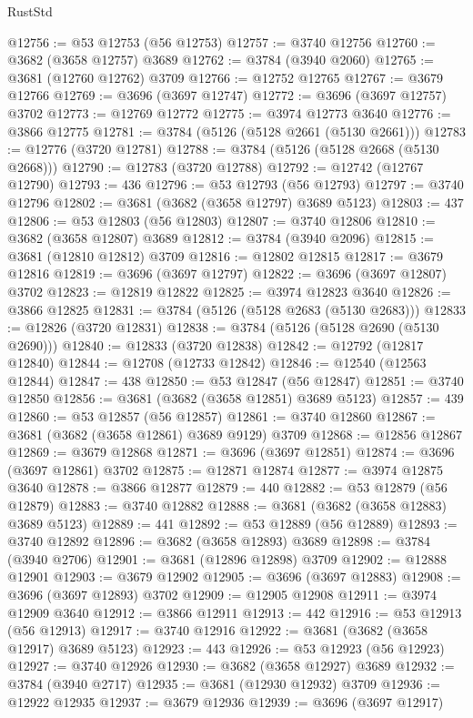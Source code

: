 \begin{lexlean}{RustStd}
\begin{coremodule}
@12756 := @53 @12753 (@56 @12753)
@12757 := @3740 @12756
@12760 := @3682 (@3658 @12757) @3689
@12762 := @3784 (@3940 @2060)
@12765 := @3681 (@12760 @12762) @3709
@12766 := @12752 @12765
@12767 := @3679 @12766
@12769 := @3696 (@3697 @12747)
@12772 := @3696 (@3697 @12757) @3702
@12773 := @12769 @12772
@12775 := @3974 @12773 @3640
@12776 := @3866 @12775
@12781 := @3784 (@5126 (@5128 @2661 (@5130 @2661)))
@12783 := @12776 (@3720 @12781)
@12788 := @3784 (@5126 (@5128 @2668 (@5130 @2668)))
@12790 := @12783 (@3720 @12788)
@12792 := @12742 (@12767 @12790)
@12793 := 436
@12796 := @53 @12793 (@56 @12793)
@12797 := @3740 @12796
@12802 := @3681 (@3682 (@3658 @12797) @3689 @5123)
@12803 := 437
@12806 := @53 @12803 (@56 @12803)
@12807 := @3740 @12806
@12810 := @3682 (@3658 @12807) @3689
@12812 := @3784 (@3940 @2096)
@12815 := @3681 (@12810 @12812) @3709
@12816 := @12802 @12815
@12817 := @3679 @12816
@12819 := @3696 (@3697 @12797)
@12822 := @3696 (@3697 @12807) @3702
@12823 := @12819 @12822
@12825 := @3974 @12823 @3640
@12826 := @3866 @12825
@12831 := @3784 (@5126 (@5128 @2683 (@5130 @2683)))
@12833 := @12826 (@3720 @12831)
@12838 := @3784 (@5126 (@5128 @2690 (@5130 @2690)))
@12840 := @12833 (@3720 @12838)
@12842 := @12792 (@12817 @12840)
@12844 := @12708 (@12733 @12842)
@12846 := @12540 (@12563 @12844)
@12847 := 438
@12850 := @53 @12847 (@56 @12847)
@12851 := @3740 @12850
@12856 := @3681 (@3682 (@3658 @12851) @3689 @5123)
@12857 := 439
@12860 := @53 @12857 (@56 @12857)
@12861 := @3740 @12860
@12867 := @3681 (@3682 (@3658 @12861) @3689 @9129) @3709
@12868 := @12856 @12867
@12869 := @3679 @12868
@12871 := @3696 (@3697 @12851)
@12874 := @3696 (@3697 @12861) @3702
@12875 := @12871 @12874
@12877 := @3974 @12875 @3640
@12878 := @3866 @12877
@12879 := 440
@12882 := @53 @12879 (@56 @12879)
@12883 := @3740 @12882
@12888 := @3681 (@3682 (@3658 @12883) @3689 @5123)
@12889 := 441
@12892 := @53 @12889 (@56 @12889)
@12893 := @3740 @12892
@12896 := @3682 (@3658 @12893) @3689
@12898 := @3784 (@3940 @2706)
@12901 := @3681 (@12896 @12898) @3709
@12902 := @12888 @12901
@12903 := @3679 @12902
@12905 := @3696 (@3697 @12883)
@12908 := @3696 (@3697 @12893) @3702
@12909 := @12905 @12908
@12911 := @3974 @12909 @3640
@12912 := @3866 @12911
@12913 := 442
@12916 := @53 @12913 (@56 @12913)
@12917 := @3740 @12916
@12922 := @3681 (@3682 (@3658 @12917) @3689 @5123)
@12923 := 443
@12926 := @53 @12923 (@56 @12923)
@12927 := @3740 @12926
@12930 := @3682 (@3658 @12927) @3689
@12932 := @3784 (@3940 @2717)
@12935 := @3681 (@12930 @12932) @3709
@12936 := @12922 @12935
@12937 := @3679 @12936
@12939 := @3696 (@3697 @12917)

\end{coremodule}
\end{lexlean}
